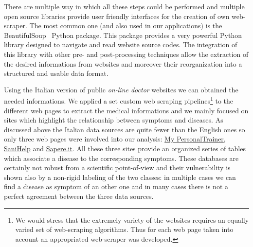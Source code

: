 \documentclass{standalone}
\begin{document}
There are multiple way in which all these steps could be performed and multiple open source libraries provide user friendly interfaces for the creation of own web-scraper.
The most common one (and also used in our applications) is the \textsf{BeautifulSoup}~\cite{richardson2007beautiful} Python package.
This package provides a very powerful Python library designed to navigate and read website source codes.
The integration of this library with other pre- and post-processing techniques allow the extraction of the desired informations from websites and moreover their reorganization into a structured and usable data format.

Using the Italian version of public \emph{on-line doctor} websites we can obtained the needed informations.
We applied a set custom web scraping pipelines\footnote{
  We would stress that the extremely variety of the websites requires an equally varied set of web-scraping algorithms.
  Thus for each web page taken into account an appropriated web-scraper was developed.
} to the different web pages to extract the medical informations and we mainly focused on sites which highlight the relationship between symptoms and diseases.
As discussed above the Italian data sources are quite fewer than the English ones so only three web pages were involved into our analysis: \href{https://m.my-personaltrainer.it/}{My PersonalTrainer}, \href{http://www.sanihelp.it/}{SaniHelp} and \href{http://www.sapere.it/}{Sapere.it}.
All these three sites provide an organized series of tables which associate a disease to the corresponding symptoms.
These databases are certainly not robust from a scientific point-of-view and their vulnerability is shown also by a non-rigid labeling of the two classes: in multiple cases we can find a disease as symptom of an other one and in many cases there is not a perfect agreement between the three data sources.
\end{document}
